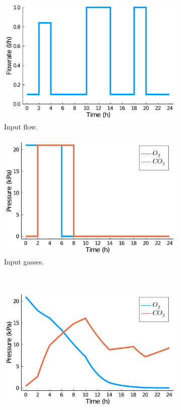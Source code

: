\begin{figure}[t]
	\centering
	\begin{subfigure}[b]{0.45\textwidth}
		\includegraphics[width=1.0\textwidth]{figure/paper 2/l12_input_flow.pdf}
		\caption{Input flow.}
		\label{figlocala}
	\end{subfigure}
	\begin{subfigure}[b]{0.45\textwidth}
		\centering
		\includegraphics[width=1.0\textwidth]{figure/paper 2/l12_input_gass.pdf}
		\caption{Input gasses.}
		\label{figlocalb}
	\end{subfigure}
	\\
	\begin{subfigure}{0.45\textwidth}
		\centering
		\includegraphics[width=1.0\textwidth]{figure/paper 2/l12_output.pdf}

\end{subfigure}
\end{figure}
